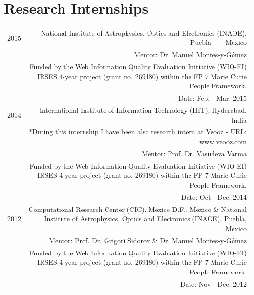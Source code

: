 \documentclass[10pt]{article}
\begin{document}
\section*{Research Internships}
\begin{tabular}{L!{\VRule}R}
	2015&National Institute of Astrophysics, Optics and Electronics (INAOE), Puebla, ~~~Mexico\\
	&\scriptsize{Mentor: Dr. Manuel Montes-y-G{\'o}mez}\\          
	&\scriptsize{Funded by the  Web Information Quality Evaluation Initiative (WIQ-EI) IRSES 4-year project (grant no. 269180) within the FP 7 Marie Curie People Framework.}\\
	&\scriptsize{Date: Feb. - Mar. 2015}\vspace{5pt}\\
	2014&International Institute of Information Technology (IIIT), Hyderabad, India\\
	&\scriptsize{*During this internship I have been also research intern at Veooz - URL: \url{www.veooz.com} }\\
	&\scriptsize{Mentor: Prof. Dr. Vasudeva Varma}\\          
	&\scriptsize{Funded by the  Web Information Quality Evaluation Initiative (WIQ-EI) IRSES 4-year project (grant no. 269180) within the FP 7 Marie Curie People Framework.}\\
	&\scriptsize{Date: Oct - Dec. 2014}\vspace{5pt}\\
	2012&Computational Research Center (CIC), Mexico D.F., Mexico \& National Institute of Astrophysics, Optics and Electronics (INAOE), Puebla, Mexico\\
	&\scriptsize{Mentor: Prof. Dr. Grigori Sidorov \& Dr. Manuel Montes-y-G{\'o}mez}\\          
	&\scriptsize{Funded by the  Web Information Quality Evaluation Initiative (WIQ-EI) IRSES 4-year project (grant no. 269180) within the FP 7 Marie Curie People Framework.}\\
	&\scriptsize{Date: Nov - Dec. 2012}\vspace{5pt}\\
\end{tabular}
\end{document}
